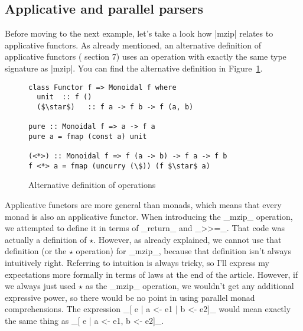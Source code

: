 \documentclass{tmr}
\newcommand{\authornote}[3]{}
\newcommand\bay[1]{\authornote{brent}{blue}{#1}}
\newcommand\tp[1]{\authornote{tomas}{red}{#1}}
\begin{document}

\subsection{Applicative and parallel parsers}
Before moving to the next example, let's take a look how |mzip| relates to applicative functors.
As already mentioned, an alternative definition of applicative functors (\cite{applicative} section 7) 
uses an operation with exactly the same type signature as |mzip|. You can find the alternative 
definition in Figure~\ref{fig:applicative-alt}.

\begin{figure}
\begin{Verbatim}[commandchars=\\\{\}, codes={\catcode`$=3\catcode`^=7}]
class Functor f => Monoidal f where
  unit  :: f ()
  ($\star$)   :: f a -> f b -> f (a, b)

pure :: Monoidal f => a -> f a
pure a = fmap (const a) unit

(<*>) :: Monoidal f => f (a -> b) -> f a -> f b
f <*> a = fmap (uncurry (\$)) (f $\star$ a)
\end{Verbatim}
\caption{Alternative definition of  operations}
\label{fig:applicative-alt}
\end{figure}

\bay{You
  should actually show this definition in addition to citing the
  applicative paper.} 
\tp{Added.}
\bay{But not all applicative functors are monads.  Surely you
  mean that we can define $\star$ in terms of bind and return for
  those AFs that are also monads?  Or perhaps this sentence should
  just be taken out?  Or perhaps you should explicitly show this
  definition of $\star$.}
\tp{Editted.}

\UndefineShortVerb{\|}
\DefineShortVerb{\_}

Applicative functors are more general than monads, which means that every monad is also an applicative functor. 
When introducing the _mzip_ operation, we attempted to define it in terms of _return_ and _>>=_. That code
was actually a definition of $\star$. However, as already explained, we cannot use that definition (or the
$\star$ operation) for _mzip_, because that definition isn't always intuitively right. Referring to 
intuition is always tricky, so I'll express my expectations more formally in terms of laws at the end of the article. 
However, if we always just used $\star$ as the _mzip_ operation, we wouldn't get any additional expressive power, so there 
would be no point in using parallel monad comprehensions. The expression _[ e | a <- e1 | b <- e2]_
would mean exactly the same thing as _[ e | a <- e1, b <- e2]_. 
\end{document}
